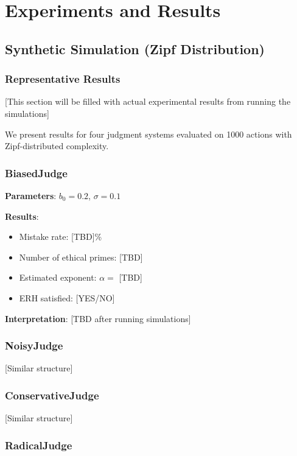 \documentclass[12pt,a4paper]{article}
\theoremstyle{definition}
\theoremstyle{remark}
\begin{document}
\section{Experiments and Results}
\label{sec:results}

\subsection{Synthetic Simulation (Zipf Distribution)}
\label{sec:synthetic}

\subsubsection{Representative Results}

[This section will be filled with actual experimental results from running the simulations]

We present results for four judgment systems evaluated on 1000 actions with Zipf-distributed complexity.

\subsubsection{BiasedJudge}

\textbf{Parameters}: $b_0 = 0.2$, $\sigma = 0.1$

\textbf{Results}:
\begin{itemize}
    \item Mistake rate: [TBD]\%
    \item Number of ethical primes: [TBD]
    \item Estimated exponent: $\alpha = $ [TBD]
    \item ERH satisfied: [YES/NO]
\end{itemize}

\textbf{Interpretation}: [TBD after running simulations]

\subsubsection{NoisyJudge}

[Similar structure]

\subsubsection{ConservativeJudge}

[Similar structure]

\subsubsection{RadicalJudge}
\end{document}
